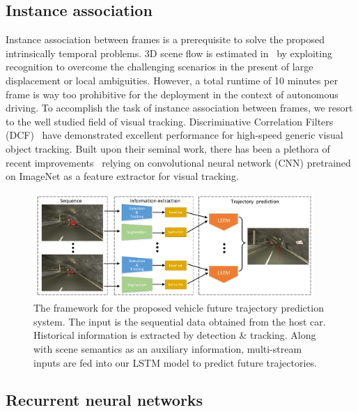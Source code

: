\documentclass[10pt,twocolumn,letterpaper]{article}
\begin{document}
\subsection{Instance association}
Instance association between frames is a prerequisite to solve the proposed intrinsically temporal problems.  3D scene flow is estimated in~\cite{behl2017bounding} by exploiting recognition to overcome the challenging scenarios in the present of large displacement or local ambiguities.
However, a total runtime of 10 minutes per frame is way too prohibitive for the deployment in the context of autonomous driving.
To accomplish the task of instance association between frames, we resort to the well studied field of visual tracking.
Discriminative Correlation Filters (DCF)~\cite{henriques2015high} have demonstrated excellent performance for high-speed generic visual object tracking.
Built upon their seminal work, there has been a plethora of recent improvements~\cite{wang2016stct, wang2015visual, hong2015online, ma2015hierarchical,danelljan2016beyond,held2016learning, wu2017kernalised,danelljan2017eco} relying on convolutional neural network (CNN) pretrained on ImageNet as a feature extractor for visual tracking.

\begin{figure}[t]
        \centering
        \includegraphics[width=0.95\textwidth]{figures/framework.pdf}
        \caption{
        The framework for the proposed vehicle future trajectory prediction system. The input is the sequential data obtained from the host car. Historical information is extracted by detection \& tracking. Along with scene semantics as an auxiliary information, multi-stream inputs are fed into our LSTM model to predict future trajectories.}

        \label{fig:framework}
\end{figure}


\subsection{Recurrent neural networks}
\end{document}
